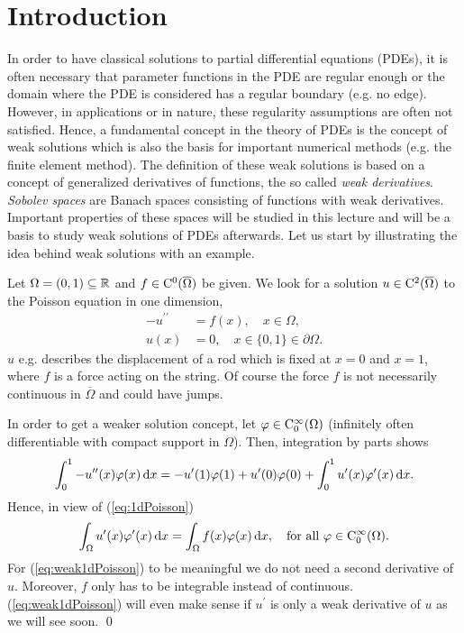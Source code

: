 \chapter{Introduction}

In order to have classical solutions to partial differential equations (PDEs), it is often necessary that parameter functions in the PDE are regular enough or the domain where the PDE is considered has a regular boundary (e.g. no edge).
However, in applications or in nature, these regularity assumptions are often not satisfied.
Hence, a fundamental concept in the theory of PDEs is the concept of weak solutions which is also the basis for important numerical methods (e.g. the finite element method).
The definition of these weak solutions is based on a concept of generalized derivatives of functions, the so called \emph{weak derivatives}. \emph{Sobolev spaces} are Banach spaces consisting of functions with weak derivatives.  
Important properties of these spaces will be studied in this lecture and will be a basis to study weak solutions of PDEs afterwards.  
Let us start by illustrating the idea behind weak solutions with an example.

\begin{ex}
  \label{ex:1dPoisson}
  Let $\Omega = (0,1) \subseteq \mathbb{R}$ and $f \in \mathrm{C}^0(\overline \Omega)$ be given. 
  We look for a solution $u \in \mathrm{C}^2(\overline \Omega)$ to the Poisson equation in one dimension,
  \begin{align}
    -u^{\prime\prime} &= f(x), \quad x \in \Omega, \label{eq:1dPoisson}\\
    u(x) &= 0, \quad x \in \{0,1\} \in \partial \Omega \nonumber.
  \end{align}
  $u$ e.g. describes the displacement of a rod which is fixed at $x = 0$ and $x = 1$, where $f$ is a force acting on the string.
  Of course the force $f$ is not necessarily continuous in $\overline\Omega$ and could have jumps.

  In order to get a weaker solution concept, let $\varphi \in \mathrm{C}_0^\infty(\Omega)$ (infinitely often differentiable with compact support in $\Omega$).
  Then, integration by parts shows
  $$
  \int_0^1 -u^{\prime\prime}(x) \varphi(x) \, {\operatorname{d}\!{x}} = -u^\prime(1) \varphi(1) + u^\prime(0)\varphi(0) + \int_0^1 u^\prime(x)\varphi^\prime(x) \, {\operatorname{d}\!{x}}.
  $$
  Hence, in view of (\ref{eq:1dPoisson})
  \begin{equation}
    \label{eq:weak1dPoisson}
    \int_\Omega u^\prime(x)\varphi^\prime(x) \, {\operatorname{d}\!{x}} = \int_\Omega f(x)\varphi(x) \, {\operatorname{d}\!{x}}, \quad \text{for all } \varphi \in \mathrm{C}_0^\infty(\Omega).
  \end{equation}
  For (\ref{eq:weak1dPoisson}) to be meaningful we do not need a second derivative of $u$.
  Moreover, $f$ only has to be integrable instead of continuous. 
  (\ref{eq:weak1dPoisson}) will even make sense if $u^\prime$ is only a weak derivative of $u$ as we will see soon. \qed
\end{ex}

